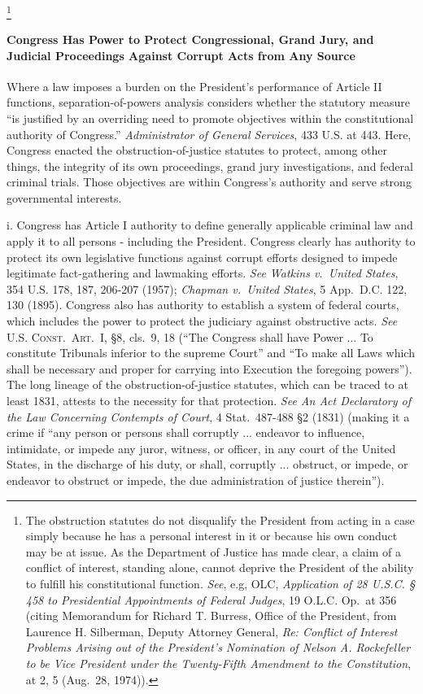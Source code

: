 \footnote{The obstruction statutes do not disqualify the President from acting in a case simply because he has a personal interest in it or because his own conduct may be at issue.
As the Department of Justice has made clear, a claim of a conflict of interest, standing alone, cannot deprive the President of the ability to fulfill his constitutional function.
\textit{See}, e.g, OLC, \textit{Application of 28 U.S.C. § 458 to Presidential Appointments of Federal Judges}, 19 O.L.C. Op.\ at 356 (citing Memorandum for Richard T. Burress, Office of the President, from Laurence H. Silberman, Deputy Attorney General, \textit{Re: Conflict of Interest Problems Arising out of the President's Nomination of Nelson A. Rockefeller to be Vice President under the Twenty-Fifth Amendment to the Constitution}, at 2, 5 (Aug.~28, 1974)).}

\paragraph{Congress Has Power to Protect Congressional, Grand Jury, and Judicial Proceedings Against Corrupt Acts from Any Source}

Where a law imposes a burden on the President’s performance of Article II functions, separation-of-powers analysis considers whether the statutory measure “is justified by an overriding need to promote objectives within the constitutional authority of Congress.”
\textit{Administrator of General Services}, 433 U.S. at 443.
Here, Congress enacted the obstruction-of-justice statutes to protect, among other things, the integrity of its own proceedings, grand jury investigations, and federal criminal trials.
Those objectives are within Congress’s authority and serve strong governmental interests.

i. Congress has Article I authority to define generally applicable criminal law and apply it to all persons - including the President.
Congress clearly has authority to protect its own legislative functions against corrupt efforts designed to impede legitimate fact-gathering and lawmaking efforts.
\textit{See Watkins v.\ United States}, 354 U.S. 178, 187, 206-207 (1957);
\textit{Chapman v.\ United States}, 5 App.\ D.C. 122, 130 (1895).
Congress also has authority to establish a system of federal courts, which includes the power to protect the judiciary against obstructive acts.
\textit{See} \textsc{U.S. Const.\ Art.~I}, \S 8, cls.~9, 18 (“The Congress shall have Power ... To constitute Tribunals inferior to the supreme Court” and “To make all Laws which shall be necessary and proper for carrying into Execution the foregoing powers”).
The long lineage of the obstruction-of-justice statutes, which can be traced to at least 1831, attests to the necessity for that protection.
\textit{See An Act Declaratory of the Law Concerning Contempts of Court}, 4 Stat.~487-488 \S 2 (1831) (making it a crime if “any person or persons shall corruptly ... endeavor to influence, intimidate, or impede any juror, witness, or officer, in any court of the United States, in the discharge of his duty, or shall, corruptly ... obstruct, or impede, or endeavor to obstruct or impede, the due administration of justice therein”).

